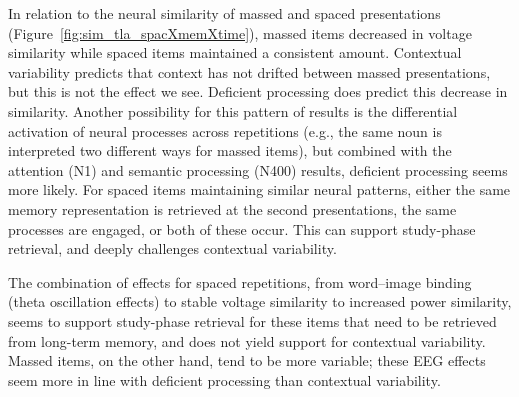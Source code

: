 In relation to the neural similarity of massed and spaced presentations (Figure~\ref{fig:sim_tla_spacXmemXtime}), massed items decreased in voltage similarity while spaced items maintained a consistent amount.  Contextual variability predicts that context has not drifted between massed presentations, but this is not the effect we see.  Deficient processing does predict this decrease in similarity.  Another possibility for this pattern of results is the differential activation of neural processes across repetitions (e.g., the same noun is interpreted two different ways for massed items), but combined with the attention (N1) and semantic processing (N400) results, deficient processing seems more likely.  For spaced items maintaining similar neural patterns, either the same memory representation is retrieved at the second presentations, the same processes are engaged, or both of these occur.  This can support study-phase retrieval, and deeply challenges contextual variability.

The combination of effects for spaced repetitions, from word--image binding (theta oscillation effects) to stable voltage similarity to increased power similarity, seems to support study-phase retrieval for these items that need to be retrieved from long-term memory, and does not yield support for contextual variability.
Massed items, on the other hand, tend to be more variable; these EEG effects seem more in line with deficient processing than contextual variability.

